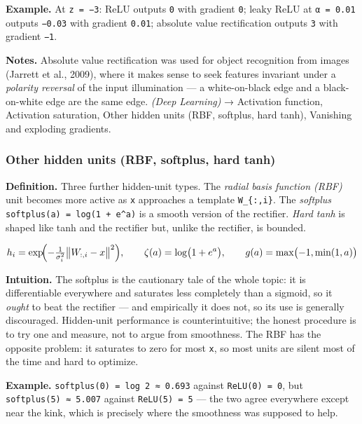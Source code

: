 \documentclass[
  10pt,
  letterpaper,
  onecolumn]{article}
\begin{document}
\textbf{Example.} At \texttt{z\ =\ −3}: ReLU outputs \texttt{0} with
gradient \texttt{0}; leaky ReLU at \texttt{α\ =\ 0.01} outputs
\texttt{−0.03} with gradient \texttt{0.01}; absolute value
rectification outputs \texttt{3} with gradient \texttt{−1}.

\textbf{Notes.} Absolute value rectification was used for object
recognition from images (Jarrett et al., 2009), where it makes sense to
seek features invariant under a \emph{polarity reversal} of the input
illumination --- a white-on-black edge and a black-on-white edge are the
same edge. \emph{(Deep Learning)} → Activation function, Activation
saturation, Other hidden units (RBF, softplus, hard tanh), Vanishing and
exploding gradients.

\hypertarget{other-hidden-units-rbf-softplus-hard-tanh}{%
\subsubsection{Other hidden units (RBF, softplus, hard
tanh)}\label{other-hidden-units-rbf-softplus-hard-tanh}}

\textbf{Definition.} Three further hidden-unit types. The
\emph{radial basis function (RBF)} unit becomes more active as
\texttt{x} approaches a template \texttt{W\_\{:,i\}}. The
\emph{softplus} \texttt{softplus(a)\ =\ log(1\ +\ e\^{}a)} is a smooth
version
of the rectifier. \emph{Hard tanh} is shaped like tanh and the rectifier
but, unlike the rectifier, is bounded.

\begin{equation*}
h_i=\exp\!\Bigl(-\tfrac{1}{\sigma_i^{2}}\bigl\|W_{:,i}-x\bigr\|^{2}\Bigr),
\qquad
\zeta(a)=\log\bigl(1+e^{a}\bigr),
\qquad
g(a)=\max\bigl(-1,\min(1,a)\bigr)
\end{equation*}

\textbf{Intuition.} The softplus is the cautionary tale of the whole
topic: it is differentiable everywhere and saturates less completely
than a sigmoid, so it \emph{ought} to beat the rectifier --- and
empirically it does not, so its use is generally discouraged.
Hidden-unit performance is counterintuitive; the honest procedure is to
try one and measure, not to argue from smoothness. The RBF has the
opposite problem: it saturates to zero for most \texttt{x}, so most
units are silent most of the time and hard to optimize.

\textbf{Example.} \texttt{softplus(0)\ =\ log\ 2\ ≈\ 0.693} against
\texttt{ReLU(0)\ =\ 0}, but
\texttt{softplus(5)\ ≈\ 5.007} against \texttt{ReLU(5)\ =\ 5} --- the
two agree everywhere except near the kink, which is precisely where the
smoothness was supposed to help.
\end{document}
